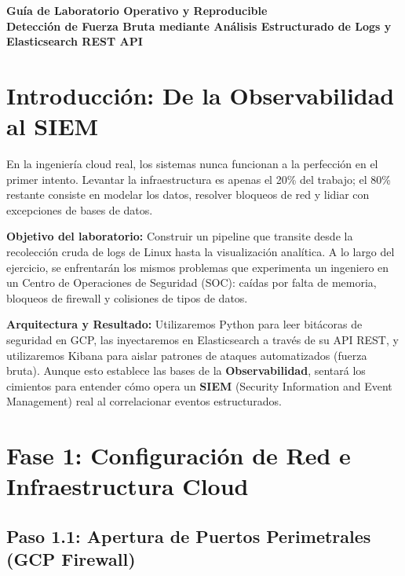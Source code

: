 \documentclass[
  coursetitle={Cómputo Nube y Tecnologías Emergentes},
  coursehours={96},
  coursedate={Verano 2026},
  doctype={Guía de Laboratorio Práctico},
  otherlangs={english,french},
  authorname={Lázaro},
  authorsurname={Bustio-Martínez},
  authortitle={PhD},
  role={Profesor Investigador},
  email={lbustio@inaoe.mx},
  phone={5559504000},
  ext={7459},
  institution={Instituto Nacional de Astrofísica, Óptica y Electrónica (INAOE)},
  department={Maestría en Ciencias en Tecnologías de Seguridad},
  address={Luis Enrique Erro 1, Sta. Ma. Tonantzintla, San Andrés Cholula, CP 72840, Puebla, México},
  margin={0.5in}
]{../../lbustio_lecture_notes}
\begin{document}
\IberoCover

\begin{center}
    \vspace{0.5cm}
    \LARGE \textbf{Guía de Laboratorio Operativo y Reproducible} \\
    \vspace{0.3cm}
    \huge \textbf{Detección de Fuerza Bruta mediante Análisis Estructurado de Logs y Elasticsearch REST API}
    \vspace{0.5cm}
\end{center}

\section{Introducción: De la Observabilidad al SIEM}
En la ingeniería cloud real, los sistemas nunca funcionan a la perfección en el primer intento. Levantar la infraestructura es apenas el 20\% del trabajo; el 80\% restante consiste en modelar los datos, resolver bloqueos de red y lidiar con excepciones de bases de datos. 

\textbf{Objetivo del laboratorio:} Construir un pipeline que transite desde la recolección cruda de logs de Linux hasta la visualización analítica. A lo largo del ejercicio, se enfrentarán los mismos problemas que experimenta un ingeniero en un Centro de Operaciones de Seguridad (SOC): caídas por falta de memoria, bloqueos de firewall y colisiones de tipos de datos.

\textbf{Arquitectura y Resultado:} Utilizaremos Python para leer bitácoras de seguridad en GCP, las inyectaremos en Elasticsearch a través de su API REST, y utilizaremos Kibana para aislar patrones de ataques automatizados (fuerza bruta). Aunque esto establece las bases de la \textbf{Observabilidad}, sentará los cimientos para entender cómo opera un \textbf{SIEM} (Security Information and Event Management) real al correlacionar eventos estructurados.

\section{Fase 1: Configuración de Red e Infraestructura Cloud}

\subsection{Paso 1.1: Apertura de Puertos Perimetrales (GCP Firewall)}
\end{document}
